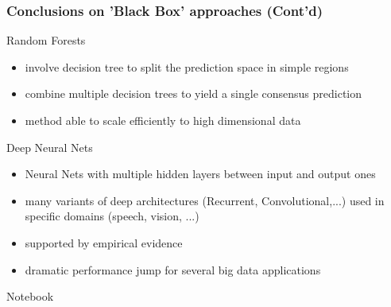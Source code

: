   \begin{frame}
  \frametitle{Conclusions on 'Black Box' approaches (Cont'd)}

   \begin{block}{ Random Forests}
   \begin{itemize}
    \item involve decision tree to split the prediction space in simple regions
    \item combine multiple decision trees to yield a single consensus prediction
    \item[\doigt] method able to scale efficiently  to high dimensional data
   \end{itemize}
   \end{block}


  \begin{block}{Deep Neural Nets}
  \begin{itemize}
   \item Neural Nets with multiple hidden layers between input and output ones
   \item many variants of deep architectures (Recurrent, Convolutional,...)  used in specific domains (speech, vision, ...)
   \item[\doigt] supported by empirical evidence
   \item[\doigt] dramatic performance jump for several big data applications
    \end{itemize}
 \end{block}

 \alert{Notebook}
\end{frame}


